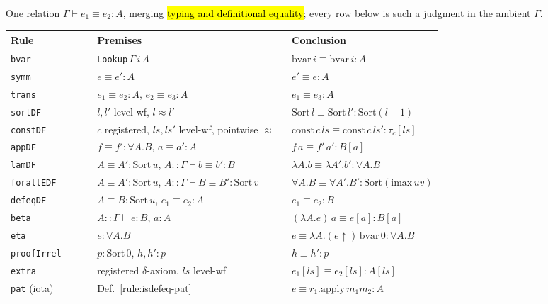 \begin{definition}
\label{def:isdefeq}
\leanok
{}

 One relation $\Gamma \vdash e_1 \equiv e_2 : A$, merging \hl{typing and
definitional equality}; every row below is such a judgment in the ambient $\Gamma$.
\begin{center}
\begin{tabular}{lp{0.45\linewidth}p{0.35\linewidth}}
\toprule
Rule & Premises & Conclusion \\
\midrule
\texttt{bvar} & \texttt{Lookup}\,$\Gamma\,i\,A$ & $\mathrm{bvar}\,i\equiv\mathrm{bvar}\,i:A$ \\
\texttt{symm} & $e\equiv e':A$ & $e'\equiv e:A$ \\
\texttt{trans} & $e_1\equiv e_2:A$, $e_2\equiv e_3:A$ & $e_1\equiv e_3:A$ \\
\texttt{sortDF} & $l,l'$ level-wf, $l\approx l'$ & $\mathrm{Sort}\,l\equiv\mathrm{Sort}\,l':\mathrm{Sort}(l{+}1)$ \\
\texttt{constDF} & $c$ registered, $ls,ls'$ level-wf, pointwise $\approx$ & $\mathrm{const}\,c\,ls\equiv\mathrm{const}\,c\,ls':\tau_c[ls]$ \\
\texttt{appDF} & $f\equiv f':\forall A.B$, $a\equiv a':A$ & $f\,a\equiv f'\,a':B[a]$ \\
\texttt{lamDF} & $A\equiv A':\mathrm{Sort}\,u$, $A{::}\Gamma\vdash b\equiv b':B$ & $\lambda A.b\equiv\lambda A'.b':\forall A.B$ \\
\texttt{forallEDF} & $A\equiv A':\mathrm{Sort}\,u$, $A{::}\Gamma\vdash B\equiv B':\mathrm{Sort}\,v$ & $\forall A.B\equiv\forall A'.B':\mathrm{Sort}(\mathrm{imax}\,uv)$ \\
\texttt{defeqDF} & $A\equiv B:\mathrm{Sort}\,u$, $e_1\equiv e_2:A$ & $e_1\equiv e_2:B$ \\
\texttt{beta} & $A{::}\Gamma\vdash e:B$, $a:A$ & $(\lambda A.e)\,a\equiv e[a]:B[a]$ \\
\texttt{eta} & $e:\forall A.B$ & $e\equiv\lambda A.(e{\uparrow})\,\mathrm{bvar}\,0:\forall A.B$ \\
\texttt{proofIrrel} & $p:\mathrm{Sort}\,0$, $h,h':p$ & $h\equiv h':p$ \\
\texttt{extra} & registered $\delta$-axiom, $ls$ level-wf & $e_1[ls]\equiv e_2[ls]:A[ls]$ \\
\texttt{pat} (iota) & Def.~\ref{rule:isdefeq-pat} & $e\equiv r_1.\mathrm{apply}\,m_1m_2:A$ \\
\bottomrule
\end{tabular}\par\smallskip
\end{center}
\end{definition}

